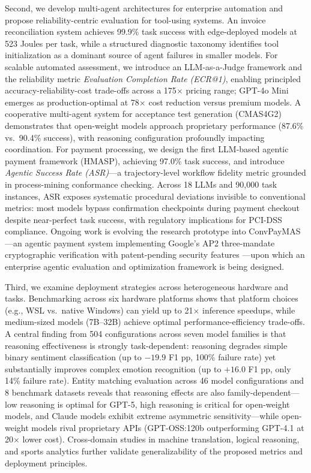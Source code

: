 \begin{singlespace}
Second, we develop multi-agent architectures for enterprise automation and propose reliability-centric evaluation for tool-using systems. An invoice reconciliation system achieves 99.9\% task success with edge-deployed models at 523 Joules per task, while a structured diagnostic taxonomy identifies tool initialization as a dominant source of agent failures in smaller models. For scalable automated assessment, we introduce an LLM-as-a-Judge framework and the reliability metric \emph{Evaluation Completion Rate (ECR@1)}, enabling principled accuracy-reliability-cost trade-offs across a 175$\times$ pricing range; GPT-4o Mini emerges as production-optimal at 78$\times$ cost reduction versus premium models. A cooperative multi-agent system for acceptance test generation (CMAS4G2) demonstrates that open-weight models approach proprietary performance (87.6\% vs.\ 90.4\% success), with reasoning configuration profoundly impacting coordination. For payment processing, we design the first LLM-based agentic payment framework (HMASP), achieving 97.0\% task success, and introduce \emph{Agentic Success Rate (ASR)}---a trajectory-level workflow fidelity metric grounded in process-mining conformance checking. Across 18 LLMs and 90{,}000 task instances, ASR exposes systematic procedural deviations invisible to conventional metrics: most models bypass confirmation checkpoints during payment checkout despite near-perfect task success, with regulatory implications for PCI-DSS compliance. Ongoing work is evolving the research prototype into ConvPayMAS---an agentic payment system implementing Google's AP2 three-mandate cryptographic verification with patent-pending security features ---upon which an enterprise agentic evaluation and optimization framework is being designed.

Third, we examine deployment strategies across heterogeneous hardware and tasks. Benchmarking across six hardware platforms shows that platform choices (e.g., WSL vs.\ native Windows) can yield up to 21$\times$ inference speedups, while medium-sized models (7B--32B) achieve optimal performance-efficiency trade-offs. A central finding from 504 configurations across seven model families is that reasoning effectiveness is strongly task-dependent: reasoning degrades simple binary sentiment classification (up to $-19.9$ F1 pp, 100\% failure rate) yet substantially improves complex emotion recognition (up to $+16.0$ F1 pp, only 14\% failure rate). Entity matching evaluation across 46 model configurations and 8 benchmark datasets reveals that reasoning effects are also family-dependent---low reasoning is optimal for GPT-5, high reasoning is critical for open-weight models, and Claude models exhibit extreme asymmetric sensitivity---while open-weight models rival proprietary APIs (GPT-OSS:120b outperforming GPT-4.1 at 20$\times$ lower cost). Cross-domain studies in machine translation, logical reasoning, and sports analytics further validate generalizability of the proposed metrics and deployment principles.


\end{singlespace}
